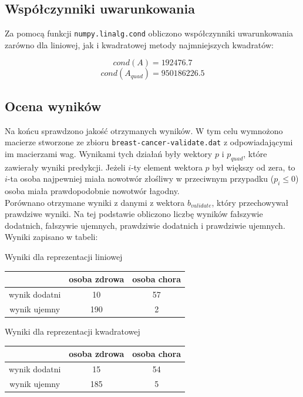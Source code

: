\documentclass{article}
\begin{document}
	\subsection*{Współczynniki uwarunkowania}
	
	Za pomocą funkcji \texttt{numpy.linalg.cond} obliczono współczynniki uwarunkowania zarówno dla liniowej, jak i kwadratowej metody najmniejszych kwadratów:
	
	$$cond(A) = 192476.7$$
	$$cond(A_{quad}) = 950186226.5$$
	
	\subsection*{Ocena wyników}
	
	Na końcu sprawdzono jakość otrzymanych wyników. W tym celu wymnożono macierze stworzone ze zbioru \texttt{breast-cancer-validate.dat} z odpowiadającymi im macierzami wag. Wynikami tych działań były wektory $p$ i $p_{quad}$, które zawierały wyniki predykcji. Jeżeli $i$-ty element wektora $p$ był większy od zera, to $i$-ta osoba najpewniej miała nowotwór złośliwy w przeciwnym przypadku ($p_i \leq 0$) osoba miała prawdopodobnie nowotwór łagodny. \\
	Porównano otrzymane wyniki z danymi z wektora $b_{validate}$, który przechowywał prawdziwe wyniki. Na tej podstawie obliczono liczbę wyników fałszywie dodatnich, fałszywie ujemnych, prawdziwie dodatnich i prawdziwie ujemnych. Wyniki zapisano w tabeli:
	
	\begin{center}
		\caption{Wyniki dla reprezentacji liniowej}
		\begin{tabular}{|c|c|c|}
  			\hline 
  			 & osoba zdrowa & osoba chora\\
  			\hline
  			wynik dodatni & 10 & 57 \\
  			\hline
  			wynik ujemny & 190 & 2 \\
  			\hline
		\end{tabular} 
		
	\end{center}
		
		
	
	\begin{center}
		\caption{Wyniki dla reprezentacji kwadratowej}
		\begin{tabular}{|c|c|c|}
  			\hline 
  			 & osoba zdrowa & osoba chora\\
  			\hline
  			wynik dodatni & 15 & 54 \\
  			\hline
  			wynik ujemny & 185 & 5 \\
  			\hline
		\end{tabular} 
		
	\end{center}
	
\end{document}
